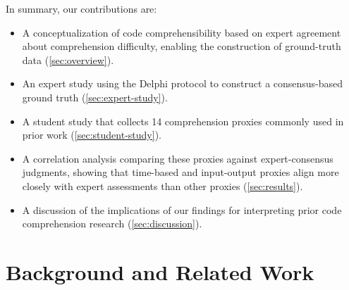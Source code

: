 In summary, our contributions are:
\begin{itemize}
	\item A conceptualization of code comprehensibility based on expert agreement about comprehension difficulty, enabling the construction of ground-truth data (\cref{sec:overview}).
	\item An expert study using the Delphi protocol to construct a consensus-based ground truth (\cref{sec:expert-study}).
	\item A student study that collects 14 comprehension proxies commonly used in prior work (\cref{sec:student-study}).
	\item A correlation analysis comparing these proxies against expert-consensus judgments, showing that time-based and input-output proxies align more closely with expert assessments than other proxies (\cref{sec:results}).
	\item A discussion of the implications of our findings for interpreting prior code comprehension research (\cref{sec:discussion}).
\end{itemize}




















 
\section{Background and Related Work}


